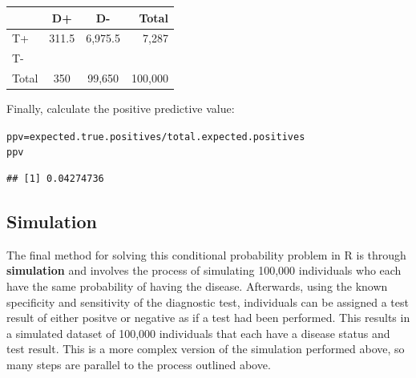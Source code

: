 \documentclass{report}\usepackage[]{graphicx}\usepackage[]{color}
\makeatletter
\newcommand{\hlopt}[1]{\textcolor[rgb]{0,0,0}{#1}}%
\newcommand{\hlstd}[1]{\textcolor[rgb]{0.345,0.345,0.345}{#1}}%
\newcommand{\hlkwb}[1]{\textcolor[rgb]{0.69,0.353,0.396}{#1}}%
\newenvironment{kframe}{%
 \def\at@end@of@kframe{}%
 \ifinner\ifhmode%
  \def\at@end@of@kframe{\end{minipage}}%
  \begin{minipage}{\columnwidth}%
 \fi\fi%
 \def\FrameCommand##1{\hskip\@totalleftmargin \hskip-\fboxsep
 \colorbox{shadecolor}{##1}\hskip-\fboxsep
     \hskip-\linewidth \hskip-\@totalleftmargin \hskip\columnwidth}%
 \MakeFramed {\advance\hsize-\width
   \@totalleftmargin\z@ \linewidth\hsize
   \@setminipage}}%
 {\par\unskip\endMakeFramed%
 \at@end@of@kframe}
\newenvironment{knitrout}{}{} %
\makeatother
\begin{document}
 
\begin{center}
\begin{tabular}{|l|c|c|r|}
\hline 
& D+ & D- & Total\\ 
\hline
T+ & 311.5 & 6,975.5 & 7,287\\ 
\hline
T- & & & \\ 
\hline 
Total & 350 & 99,650 & 100,000 \\ 
\hline 
\end{tabular} 
\end{center}

Finally, calculate the positive predictive value: 
\begin{knitrout}
\color{fgcolor}\begin{kframe}
\begin{alltt}
\hlstd{ppv} \hlkwb{=} \hlstd{expected.true.positives}\hlopt{/}\hlstd{total.expected.positives}
\hlstd{ppv}
\end{alltt}
\begin{verbatim}
## [1] 0.04274736
\end{verbatim}
\end{kframe}
\end{knitrout}


\subsection{Simulation}


The final method for solving this conditional probability problem in \textsf{R} is through \textbf{simulation} and involves the process of simulating 100,000 individuals who each have the same probability of having the disease.  Afterwards, using the known specificity and sensitivity of the diagnostic test, individuals can be assigned a test result of either positve or negative as if a test had been performed.  This results in a simulated dataset of 100,000 individuals that each have a disease status and test result. This is a more complex version of the simulation performed above, so many steps are parallel to the process outlined above.  
\end{document}
